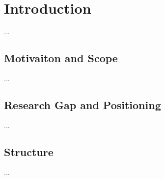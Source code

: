 \clearpage
\section{Introduction}
\label{sec:Intro}
...

\subsection{Motivaiton and Scope}
\label{subsec:Intro/motivaiton}
...

\subsection{Research Gap and Positioning}
\label{subsec:Intro/gap}
...

\subsection{Structure}
\label{subsec:Intro/structure}
...